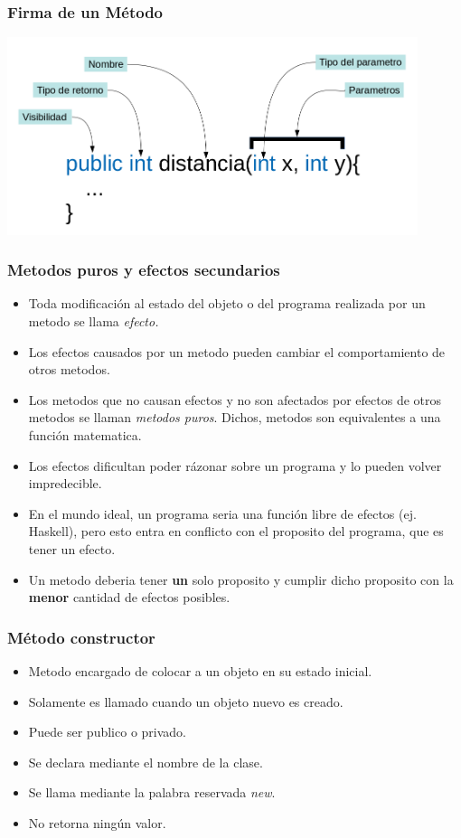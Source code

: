 \documentclass{beamer}
\begin{document}
\begin{frame}
\frametitle{Firma de un M\'etodo}
\includegraphics[width=12cm]{Firma.png}
\end{frame}

\begin{frame}
    \frametitle{Metodos puros y efectos secundarios}
    \begin{itemize}
        \item Toda modificaci\'on al estado del objeto o del programa realizada por un metodo se llama \emph{efecto.}
        \item Los efectos causados por un metodo pueden cambiar el comportamiento de otros metodos.
        \item{Los metodos que no causan efectos y no son afectados por efectos de otros metodos
        se llaman \emph{metodos puros}. Dichos, metodos son equivalentes a una funci\'on matematica.}
        \item{Los efectos dificultan poder r\'azonar sobre un programa y lo pueden volver impredecible.}
        \item{En el mundo ideal, un programa seria una funci\'on libre de efectos (ej. Haskell\cite{Haskell}),
        pero esto entra en conflicto con el proposito del programa, que es tener un efecto.}
        \item{Un metodo deberia tener {\bf un} solo proposito y cumplir dicho proposito
        con la {\bf menor} cantidad de efectos posibles.}
    \end{itemize}
\end{frame}

\begin{frame}
\frametitle{M\'etodo constructor}
\begin{itemize}
    \item Metodo encargado de colocar a un objeto en su estado inicial.
    \item Solamente es llamado cuando un objeto nuevo es creado.
    \item Puede ser publico o privado.
    \item Se declara mediante el nombre de la clase.
    \item Se llama mediante la palabra reservada \emph{new}.
    \item{No retorna ning\'un valor.}
\end{itemize}
\end{frame}
\end{document}
